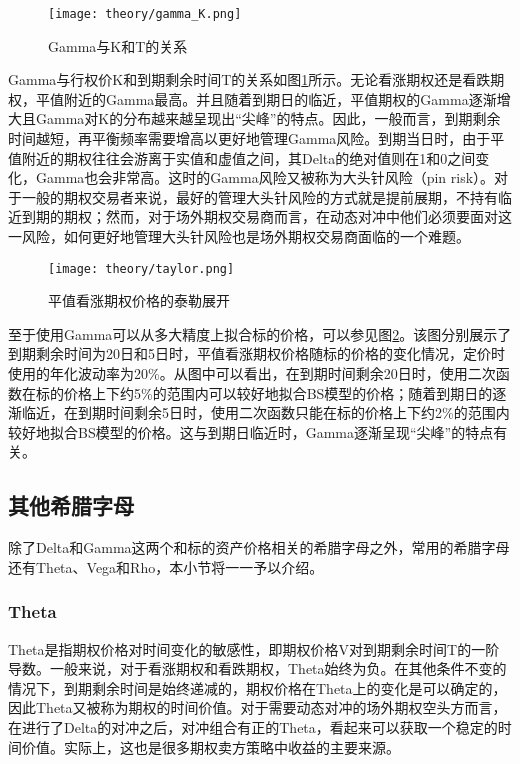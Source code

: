 \begin{figure}[htb]
  \centering
  \texttt{[image: theory/gamma\_K.png]}
  \caption[这里将出现在插图索引中]
    {Gamma与K和T的关系}
  \label{fig:gamma_k}
\end{figure}

Gamma与行权价K和到期剩余时间T的关系如图\ref{fig:gamma_k}所示。无论看涨期权还是看跌期权，平值附近的Gamma最高。并且随着到期日的临近，平值期权的Gamma逐渐增大且Gamma对K的分布越来越呈现出“尖峰”的特点。因此，一般而言，到期剩余时间越短，再平衡频率需要增高以更好地管理Gamma风险。到期当日时，由于平值附近的期权往往会游离于实值和虚值之间，其Delta的绝对值则在1和0之间变化，Gamma也会非常高。这时的Gamma风险又被称为大头针风险（pin risk）。对于一般的期权交易者来说，最好的管理大头针风险的方式就是提前展期，不持有临近到期的期权；然而，对于场外期权交易商而言，在动态对冲中他们必须要面对这一风险，如何更好地管理大头针风险也是场外期权交易商面临的一个难题。

\begin{figure}[htb]
  \centering
  \texttt{[image: theory/taylor.png]}
  \caption[这里将出现在插图索引中]
    {平值看涨期权价格的泰勒展开}
  \label{fig:taylor}
\end{figure}

至于使用Gamma可以从多大精度上拟合标的价格，可以参见图\ref{fig:taylor}。该图分别展示了到期剩余时间为20日和5日时，平值看涨期权价格随标的价格的变化情况，定价时使用的年化波动率为20\%。从图中可以看出，在到期时间剩余20日时，使用二次函数在标的价格上下约5\%的范围内可以较好地拟合BS模型的价格；随着到期日的逐渐临近，在到期时间剩余5日时，使用二次函数只能在标的价格上下约2\%的范围内较好地拟合BS模型的价格。这与到期日临近时，Gamma逐渐呈现“尖峰”的特点有关。

\subsection{其他希腊字母}

除了Delta和Gamma这两个和标的资产价格相关的希腊字母之外，常用的希腊字母还有Theta、Vega和Rho，本小节将一一予以介绍。

\subsubsection{Theta}

Theta是指期权价格对时间变化的敏感性，即期权价格V对到期剩余时间T的一阶导数。一般来说，对于看涨期权和看跌期权，Theta始终为负。在其他条件不变的情况下，到期剩余时间是始终递减的，期权价格在Theta上的变化是可以确定的，因此Theta又被称为期权的时间价值。对于需要动态对冲的场外期权空头方而言，在进行了Delta的对冲之后，对冲组合有正的Theta，看起来可以获取一个稳定的时间价值。实际上，这也是很多期权卖方策略中收益的主要来源。

